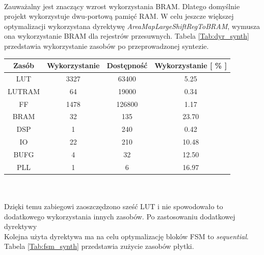 \documentclass[11pt,a4paper]{article}
\begin{document}
\\
Zauważalny jest znaczący wzrost wykorzystania BRAM. Dlatego domyślnie projekt wykorzystuje dwu-portową pamięć RAM. W celu jeszcze większej optymalizacji wykorzystana dyrektywę \textit{AreaMapLargeShiftRegToBRAM}, wymusza ona wykorzystanie BRAM dla rejestrów przesuwnych. Tabela \ref{Tab:dyr_synth} przedstawia wykorzystanie zasobów po przeprowadzonej syntezie.\\
\begin{minipage}[c]{\textwidth}
		 \begin{center}
				\begin{tabular}{|c|c|c|c|}
					\hline
					Zasób & Wykorzystanie & Dostępność & Wykorzystanie [ \% ] \\ 
					\hline
					LUT & 3327 & 63400 & 5.25  \\
					\hline
					LUTRAM & 64 & 19000 & 0.34  \\
					\hline
					FF & 1478 & 126800 & 1.17 \\
					\hline
					BRAM & 32 & 135 & 23.70 \\
					\hline
					DSP & 1 & 240 & 0.42 \\
					\hline
					IO & 22 & 210 & 10.48 \\
					\hline
					BUFG & 4 & 32 & 12.50 \\
					\hline
					PLL & 1 & 6 & 16.97 \\
					\hline																			\end{tabular}
		\end{center}
\end{minipage}\\
\\
Dzięki temu zabiegowi zaoszczędzono sześć LUT i nie spowodowało to dodatkowego wykorzystania innych zasobów. Po zastosowaniu dodatkowej dyrektywy \\
Kolejna użyta dyrektywa ma na celu optymalizację bloków FSM to \textit{sequential}. Tabela \ref{Tab:fsm_synth} przedstawia zużycie zasobów płytki.\\
\end{document}
